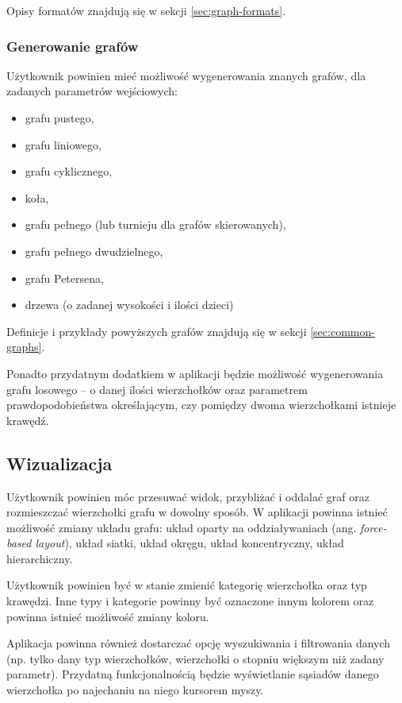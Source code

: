 Opisy formatów znajdują się w sekcji \ref{sec:graph-formats}.

\subsubsection{Generowanie grafów}

Użytkownik powinien mieć możliwość wygenerowania znanych grafów, dla zadanych parametrów wejściowych:

\begin{itemize}
\setlength\itemsep{0em}
\item grafu pustego,
\item grafu liniowego,
\item grafu cyklicznego,
\item koła,
\item grafu pełnego (lub turnieju dla grafów skierowanych),
\item grafu pełnego dwudzielnego,
\item grafu Petersena,
\item drzewa (o zadanej wysokości i ilości dzieci)
\end{itemize}

Definicje i przykłady powyższych grafów znajdują się w sekcji \ref{sec:common-graphs}.

Ponadto przydatnym dodatkiem w aplikacji będzie możliwość wygenerowania grafu losowego -- o danej ilości wierzchołków oraz parametrem prawdopodobieństwa określającym, czy pomiędzy dwoma wierzchołkami istnieje krawędź.  

\subsection{Wizualizacja}

Użytkownik powinien móc przesuwać widok, przybliżać i oddalać graf oraz rozmieszczać wierzchołki grafu w dowolny sposób. W aplikacji powinna istnieć możliwość zmiany układu grafu: układ oparty na oddziaływaniach (ang. \textit{force-based layout}), układ siatki, układ okręgu, układ koncentryczny, układ hierarchiczny. 

Użytkownik powinien być w stanie zmienić kategorię wierzchołka oraz typ krawędzi. Inne typy i kategorie powinny być oznaczone innym kolorem oraz powinna istnieć możliwość zmiany koloru. 

Aplikacja powinna również dostarczać opcję wyszukiwania i filtrowania danych (np. tylko dany typ wierzchołków, wierzchołki o stopniu większym niż zadany parametr). Przydatną funkcjonalnością będzie wyświetlanie sąsiadów danego wierzchołka po najechaniu na niego kursorem myszy.

